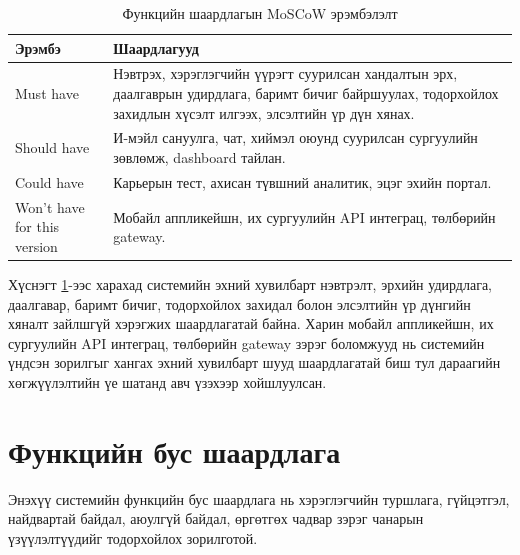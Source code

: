 \begin{table}[H]
\centering
\caption{Функцийн шаардлагын MoSCoW эрэмбэлэлт}
\label{tab:moscow-requirements}
{\small
\renewcommand{\arraystretch}{1.25}
\begin{tabular}{|p{3.2cm}|p{10.5cm}|}
\hline
\textbf{Эрэмбэ} & \textbf{Шаардлагууд} \\
\hline
Must have & Нэвтрэх, хэрэглэгчийн үүрэгт суурилсан хандалтын эрх, даалгаврын удирдлага, баримт бичиг байршуулах, тодорхойлох захидлын хүсэлт илгээх, элсэлтийн үр дүн хянах. \\
\hline
Should have & И-мэйл сануулга, чат, хиймэл оюунд суурилсан сургуулийн зөвлөмж, dashboard тайлан. \\
\hline
Could have & Карьерын тест, ахисан түвшний аналитик, эцэг эхийн портал. \\
\hline
Won't have for this version & Мобайл аппликейшн, их сургуулийн API интеграц, төлбөрийн gateway. \\
\hline
\end{tabular}
}
\end{table}

Хүснэгт \ref{tab:moscow-requirements}-ээс харахад системийн эхний хувилбарт
нэвтрэлт, эрхийн удирдлага, даалгавар, баримт бичиг, тодорхойлох захидал
болон элсэлтийн үр дүнгийн хяналт зайлшгүй хэрэгжих шаардлагатай байна.
Харин мобайл аппликейшн, их сургуулийн API интеграц, төлбөрийн gateway
зэрэг боломжууд нь системийн үндсэн зорилгыг хангах эхний хувилбарт
шууд шаардлагатай биш тул дараагийн хөгжүүлэлтийн үе шатанд авч үзэхээр
хойшлуулсан.

\section{Функцийн бус шаардлага}

Энэхүү системийн функцийн бус шаардлага нь хэрэглэгчийн
туршлага, гүйцэтгэл, найдвартай байдал, аюулгүй байдал,
өргөтгөх чадвар зэрэг чанарын үзүүлэлтүүдийг тодорхойлох
зорилготой.

